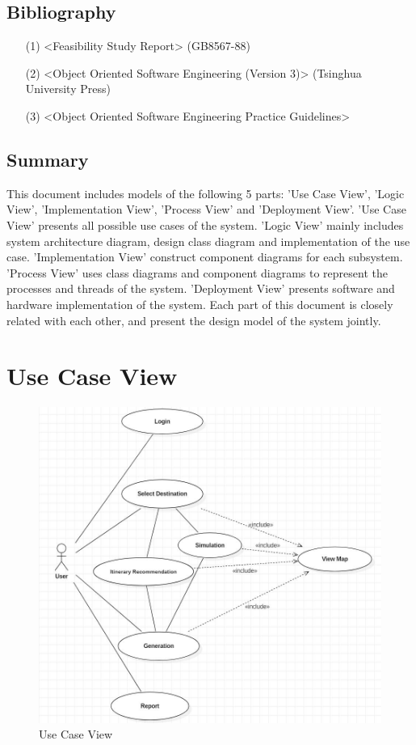\documentclass[10pt]{article}
\begin{document}
\subsection{Bibliography}
\begin{itemize}
  \item[(1)] <Feasibility Study Report> (GB8567-88)
  \item[(2)] <Object Oriented Software Engineering (Version 3)> (Tsinghua University Press)
  \item[(3)] <Object Oriented Software Engineering Practice Guidelines>
\end{itemize}

\subsection{Summary}
This document includes models of the following 5 parts: 'Use Case View', 'Logic View', 'Implementation View', 'Process View' and 'Deployment View'. 'Use Case View' presents all possible use cases of the system. 'Logic View' mainly includes system architecture diagram, design class diagram and implementation of the use case. 'Implementation View' construct component diagrams for each subsystem. 'Process View' uses class diagrams and component diagrams to represent the processes and threads of the system. 'Deployment View' presents software and hardware implementation of the system. Each part of this document is closely related with each other, and present the design model of the system jointly.

\section{Use Case View}

\begin{figure}[H]
    \centering
    \includegraphics[width=14cm]{usecase.jpg}
    \caption{Use Case View}
    \label{Use Case View}
\end{figure}
\end{document}
